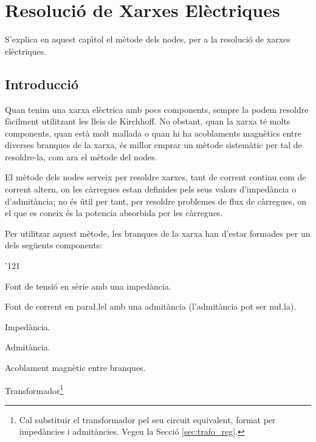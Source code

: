 \chapter{Resoluci\'{o} de Xarxes El\`{e}ctriques} \label{chap:nusos}

S'explica en aquest cap\'{\i}tol el
m\`{e}tode dels nodes, per a la resoluci\'{o} de xarxes el\`{e}ctriques.

\section{Introducci\'{o}}

Quan tenim una xarxa el\`{e}ctrica amb pocs components, sempre la podem resoldre f\`{a}cilment
utilitzant les lleis de Kirchhoff. No obstant, quan la xarxa t\'{e} molts components, quan est\`{a}
 molt mallada o quan hi ha acoblaments magn\`{e}tics entre diverses branques de la xarxa, \'{e}s millor
 emprar un m\`{e}tode sistem\`{a}tic per tal de resoldre-la, com ara el m\`{e}tode del nodes.

El m\`{e}tode dels nodes serveix per resoldre xarxes, tant de corrent continu com de corrent altern, on
les c\`{a}rregues estan definides pels seus valors d'imped\`{a}ncia o d'admit\`{a}ncia; no \'{e}s \'{u}til per tant, per
resoldre problemes de flux de c\`{a}rregues, on el que es coneix \'{e}s la potencia absorbida per les
c\`{a}rregues.

Per utilitzar aquest m\`{e}tode, les branques de la xarxa han d'estar
formades per un dels seg\"{u}ents components: \vspace{-1.5mm}
\begin{dinglist}{'121}
   \item Font de tensi\'{o} en s\`{e}rie amb una imped\`{a}ncia.
   \item Font de corrent en para{\l.l}el amb una admit\`{a}ncia (l'admit\`{a}ncia pot ser nu{\l.l}a).
   \item Imped\`{a}ncia.
   \item Admit\`{a}ncia.
   \item Acoblament magn\`{e}tic entre branques.
   \item Transformador\footnote{Cal substituir el transformador pel seu circuit equivalent, format per imped\`{a}ncies i
   admit\`{a}ncies. Vegeu la Secci\'{o} \ref{sec:trafo_reg}.}
\end{dinglist}
\vspace{-1.5mm}

